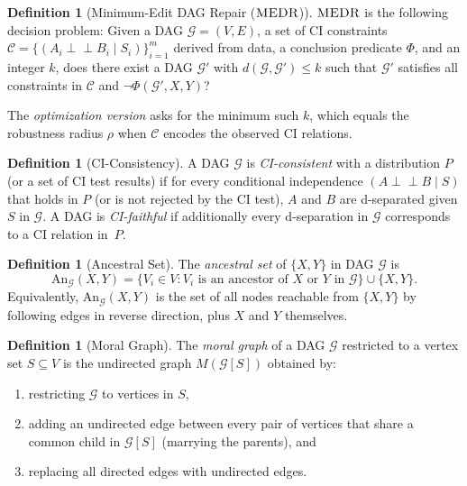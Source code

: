 \documentclass[11pt,a4paper]{article}
\theoremstyle{definition}
\newtheorem{definition}[theorem]{Definition}
\theoremstyle{remark}
\newcommand{\CI}{\perp\!\!\!\perp}
\newcommand{\DAG}{\mathcal{G}}
\newcommand{\An}{\mathrm{An}}
\newcommand{\editdist}{d}
\newcommand{\radius}{\rho}
\newcommand{\MEDR}{\textsc{MEDR}}
\newcommand{\Phi}{\varPhi}
\begin{document}
\begin{definition}[Minimum-Edit DAG Repair ($\MEDR$)]\label{def:medr}
$\MEDR$ is the following decision problem: Given a DAG $\DAG = (V, E)$, a set of
CI constraints $\mathcal{C} = \{(A_i \CI B_i \mid S_i)\}_{i=1}^m$ derived from data,
a conclusion predicate $\Phi$, and an integer $k$, does there exist a DAG $\DAG'$ with
$\editdist(\DAG, \DAG') \leq k$ such that $\DAG'$ satisfies all constraints in
$\mathcal{C}$ and $\neg\Phi(\DAG', X, Y)$?

The \emph{optimization version} asks for the minimum such $k$, which equals the
robustness radius $\radius$ when $\mathcal{C}$ encodes the observed CI relations.
\end{definition}

\begin{definition}[CI-Consistency]\label{def:ci_consistency}
A DAG $\DAG$ is \emph{CI-consistent} with a distribution $P$ (or a set of CI test
results) if for every conditional independence $(A \CI B \mid S)$ that holds in $P$ (or
is not rejected by the CI test), $A$ and $B$ are d-separated given $S$ in $\DAG$. A DAG
is \emph{CI-faithful} if additionally every d-separation in $\DAG$ corresponds to a CI
relation in~$P$.
\end{definition}

\begin{definition}[Ancestral Set]\label{def:ancestral}
The \emph{ancestral set} of $\{X, Y\}$ in DAG $\DAG$ is
\[
  \An_\DAG(X, Y) = \{V_i \in V : V_i \text{ is an ancestor of } X \text{ or } Y
  \text{ in } \DAG\} \cup \{X, Y\}.
\]
Equivalently, $\An_\DAG(X, Y)$ is the set of all nodes reachable from $\{X, Y\}$ by
following edges in reverse direction, plus $X$ and $Y$ themselves.
\end{definition}

\begin{definition}[Moral Graph]\label{def:moral}
The \emph{moral graph} of a DAG $\DAG$ restricted to a vertex set $S \subseteq V$ is
the undirected graph $M(\DAG[S])$ obtained by:
\begin{enumerate}[label=(\alph*)]
  \item restricting $\DAG$ to vertices in $S$,
  \item adding an undirected edge between every pair of vertices that share a common
    child in $\DAG[S]$ (marrying the parents), and
  \item replacing all directed edges with undirected edges.
\end{enumerate}
\end{definition}
\end{document}
